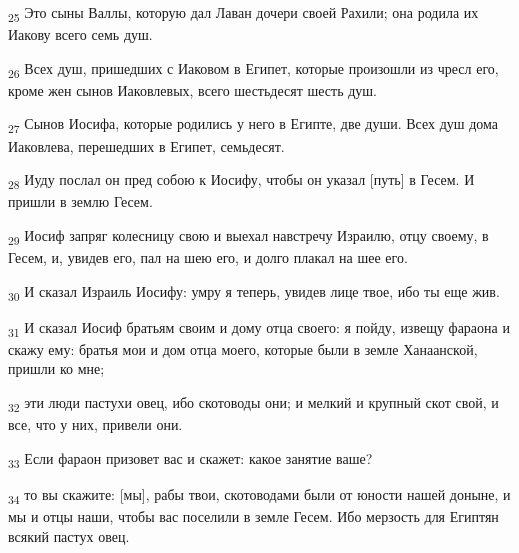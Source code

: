 \begin{tcolorbox}
\textsubscript{25} Это сыны Валлы, которую дал Лаван дочери своей Рахили; она родила их Иакову всего семь душ.
\end{tcolorbox}
\begin{tcolorbox}
\textsubscript{26} Всех душ, пришедших с Иаковом в Египет, которые произошли из чресл его, кроме жен сынов Иаковлевых, всего шестьдесят шесть душ.
\end{tcolorbox}
\begin{tcolorbox}
\textsubscript{27} Сынов Иосифа, которые родились у него в Египте, две души. Всех душ дома Иаковлева, перешедших в Египет, семьдесят.
\end{tcolorbox}
\begin{tcolorbox}
\textsubscript{28} Иуду послал он пред собою к Иосифу, чтобы он указал [путь] в Гесем. И пришли в землю Гесем.
\end{tcolorbox}
\begin{tcolorbox}
\textsubscript{29} Иосиф запряг колесницу свою и выехал навстречу Израилю, отцу своему, в Гесем, и, увидев его, пал на шею его, и долго плакал на шее его.
\end{tcolorbox}
\begin{tcolorbox}
\textsubscript{30} И сказал Израиль Иосифу: умру я теперь, увидев лице твое, ибо ты еще жив.
\end{tcolorbox}
\begin{tcolorbox}
\textsubscript{31} И сказал Иосиф братьям своим и дому отца своего: я пойду, извещу фараона и скажу ему: братья мои и дом отца моего, которые были в земле Ханаанской, пришли ко мне;
\end{tcolorbox}
\begin{tcolorbox}
\textsubscript{32} эти люди пастухи овец, ибо скотоводы они; и мелкий и крупный скот свой, и все, что у них, привели они.
\end{tcolorbox}
\begin{tcolorbox}
\textsubscript{33} Если фараон призовет вас и скажет: какое занятие ваше?
\end{tcolorbox}
\begin{tcolorbox}
\textsubscript{34} то вы скажите: [мы], рабы твои, скотоводами были от юности нашей доныне, и мы и отцы наши, чтобы вас поселили в земле Гесем. Ибо мерзость для Египтян всякий пастух овец.
\end{tcolorbox}
